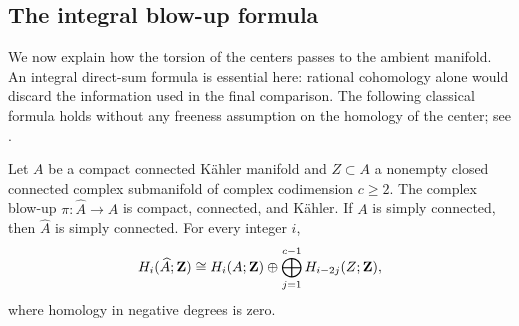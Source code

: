 \subsection{The integral blow-up formula}

We now explain how the torsion of the centers passes to the ambient
manifold. An integral direct-sum formula is essential here: rational
cohomology alone would discard the information used in the final
comparison. The following classical formula holds without any
freeness assumption on the homology of the center; see
\cite[Theorem~4.1]{DuanLi2009}.

\begin{proposition}
\label{geo:blowup}
Let $A$ be a compact connected K\"ahler manifold and
$Z\subset A$ a nonempty closed connected complex submanifold of complex
codimension $c\geq2$. The complex blow-up
$\pi:\widehat A\to A$ is compact, connected, and K\"ahler.
If $A$ is simply connected, then $\widehat A$ is simply connected.
For every integer $i$,
\begin{equation}
\label{geo:blowup-homology}
 H_i(\widehat A;\mathbf Z)\cong
 H_i(A;\mathbf Z)\oplus\bigoplus_{j=1}^{c-1}H_{i-2j}(Z;\mathbf Z),
\end{equation}
where homology in negative degrees is zero.
\end{proposition}

